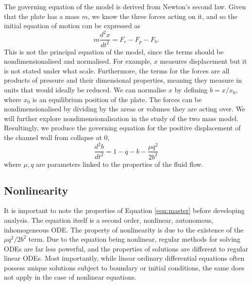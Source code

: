 \documentclass{report}
\begin{document}
The governing equation of the model is derived from Newton's second law.
Given that the plate has a mass $m$, we know the three forces acting on it,
and so the initial equation of motion can be expressed as
\begin{equation}
    m\frac{d^2 x}{dt^2} = F_e - F_p - F_b.
    \label{eqn:model_init}
\end{equation}
This is not the principal equation of the model,
since the terms should be nondimensionalised and normalised.
For example, $x$ measures displacement but it is not stated under what scale.
Furthermore, the terms for the forces are all products of pressure and their dimensional properties,
meaning they measure in units that would ideally be reduced.
We can normalise $x$ by defining $b = x/x_0$, where $x_0$ is an equilibrium position of the plate.
The forces can be nondimensionalised by dividing by the areas or volumes they are acting over.
We will further explore nondimensionalisation in the study of the two mass model.
Resultingly, we produce the governing equation for the positive displacement of the channel wall from collapse at $0$,
\begin{equation}
    \frac{d^2b}{dt^2} = 1 - q - b - \frac{\mu q^2}{2b^2}
    \label{eqn:master}
\end{equation}
where $\mu, q$ are parameters linked to the properties of the fluid flow.


\subsection{Nonlinearity}

It is important to note the properties of Equation \ref{eqn:master} before developing analysis.
The equation itself is a second order, nonlinear, autonomous, inhomogeneous ODE.
The property of nonlinearity is due to the existence of the $\mu q^2/2b^2$ term.
Due to the equation being nonlinear, regular methods for solving ODEs are far less powerful,
and the properties of solutions are different to regular linear ODEs.
Most importantly, while linear ordinary differential equations often possess unique solutions subject to boundary or initial conditions,
the same does not apply in the case of nonlinear equations.
\end{document}
